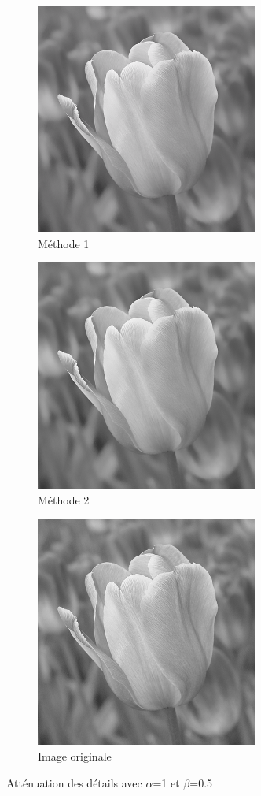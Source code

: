 \documentclass[twoside,UTF8]{EPURapport}
\begin{document}
\begin{figure}
        \centering
        \begin{subfigure}[b]{0.3\textwidth}
                \includegraphics[scale=0.45]{images/flower1_1_05.png} 
                \caption{Méthode 1}
        \end{subfigure}
        \qquad \qquad
        \begin{subfigure}[b]{0.3\textwidth}
                \includegraphics[scale=0.45]{images/flower2_1_05.png}
                \caption{Méthode 2}
        \end{subfigure}
        
        \begin{subfigure}[b]{0.3\textwidth}
                \includegraphics[scale=0.45]{images/flower.png}
             	\caption{Image originale}
        \end{subfigure}
        \caption{Atténuation des détails avec $\alpha$=1 et $\beta$=0.5}
\end{figure}
\end{document}
